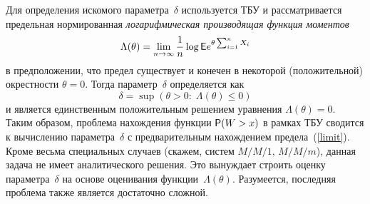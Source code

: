 \begin{multicols}{2}
Для определения искомого параметра~$\delta$ используется  ТБУ и
рассматривается предельная нормированная {\it логарифмическая
производящая функция моментов}
\begin{equation}
\Lambda (\theta) = \lim_{n \to \infty}\frac{1}{n}\log {\sf E} e^{\theta
\sum_{i=1}^n X_i}
\label{limit}
\end{equation}
в предположении, что предел существует и конечен в некоторой
(положительной) окрестности  $\theta=0$. Тогда параметр~$\delta$
определяется как
\begin{equation*}
\delta = \sup (\theta >0:\; \Lambda (\theta) \le 0)
\end{equation*}
и является единственным положительным решением  уравнения
$\Lambda (\theta)=0$. %
Таким образом,  проблема нахождения функции ${\sf P}(W>x)$   в рамках ТБУ
сводится к вычислению параметра~$\delta$  с предварительным
нахождением предела~(\ref{limit}).  Кроме весьма специальных случаев
(скажем, систем $M/M/1,\,M/M/m$),  данная  задача  не имеет
аналитического решения.  Это вынуждает строить  оценку параметра~$\delta$ 
на основе оценивания функции~$\Lambda(\theta)$. Разумеется,
 последняя проблема также является достаточно сложной.


\end{multicols}
